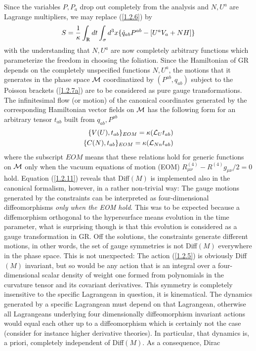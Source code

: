 \documentclass[12pt]{report}
\def\be{\begin{equation}}
\def\ee{\end{equation}}
\def\ba{\begin{eqnarray}}
\def\ea{\end{eqnarray}}
\def\Rl{{\mathchoice
{\setbox0=\hbox{$\displaystyle\rm R$}\hbox{\hbox to0pt
{\kern0.4\wd0\vrule height0.9\ht0\hss}\box0}}
{\setbox0=\hbox{$\textstyle\rm R$}\hbox{\hbox to0pt
{\kern0.4\wd0\vrule height0.9\ht0\hss}\box0}}
{\setbox0=\hbox{$\scriptstyle\rm R$}\hbox{\hbox to0pt
{\kern0.4\wd0\vrule height0.9\ht0\hss}\box0}}
{\setbox0=\hbox{$\scriptscriptstyle\rm R$}\hbox{\hbox to0pt
{\kern0.4\wd0\vrule height0.9\ht0\hss}\box0}}}}
\begin{document}
Since the 
variables $P,P_a$ drop out completely from the analysis and $N,U^a$ 
are Lagrange multipliers, we may replace (\ref{1.2.6}) by
\be \label{1.2.10}
S=\frac{1}{\kappa}\int_\Rl dt \int_\sigma 
d^3x \{\dot{q}_{ab} P^{ab}-[U^a V_a+N H]\}
\ee
with the understanding that $N,U^a$ are now completely arbitrary 
functions which parameterize the freedom in choosing the foliation.
Since the Hamiltonian of GR depends on the completely unspecified functions
$N,U^a$, the motions that it generates in the phase space $\cal M$
coordinatized by $(P^{ab},q_{ab})$ subject to the Poisson brackets 
(\ref{1.2.7a}) are to be considered as pure 
gauge transformations. The infinitesimal flow (or motion) of the canonical 
coordinates generated by 
the corresponding
Hamiltonian vector fields on $\cal M$ has the following form for an 
arbitrary tensor $t_{ab}$ built from $q_{ab}, P^{ab}$
\ba \label{1.2.11}
\{V(U),t_{ab}\}_{EOM}=\kappa ({\cal L}_U 
t_{ab})
\nonumber\\
\{C(N),t_{ab}\}_{EOM}=\kappa
({\cal L}_{Nn} t_{ab})
\ea
where the subscript $EOM$ means that these relations hold for generic
functions on $\cal M$ only when the vacuum equations of motion (EOM)
$R^{(4)}_{\mu\nu}-R^{(4)} g_{\mu\nu}/2=0$ hold. Equation (\ref{1.2.11})
reveals that Diff$(M)$ is implemented also in the canonical formalism, 
however, in a rather non-trivial way: The gauge motions generated by the 
constraints can be interpreted as four-dimensional diffeomorphisms {\it
only when the EOM hold}. This was to be expected because a diffemorphism
orthogonal to the hypersurface means evolution in the time 
parameter, what is surprising though is that this evolution is considered 
as a 
gauge transformation in GR. Off the solutions, the constraints generate 
different motions, in other words, the set of gauge symmetries is 
not Diff$(M)$ everywhere in the phase space. This is not unexpected: The 
action (\ref{1.2.5})
is obviously Diff$(M)$ invariant, but so would be any action that is an 
integral over a four-dimensional scalar density of weight one formed
from polynomials in the curvature tensor and its covariant derivatives.
This symmetry is completely insensitive to the specific Lagrangean in 
question, it is kinematical. The dynamics generated by a specific 
Lagrangean must depend on that Lagrangean, otherwise all 
Lagrangeans underlying four dimensionally
diffeomorphism invariant actions would equal each other up to a 
diffeomorphism which is certainly not the case (consider for instance 
higher derivative theories). In particular, that dynamics is, a 
priori, completely independent of Diff$(M)$. As a consequence, Dirac 
\end{document}
